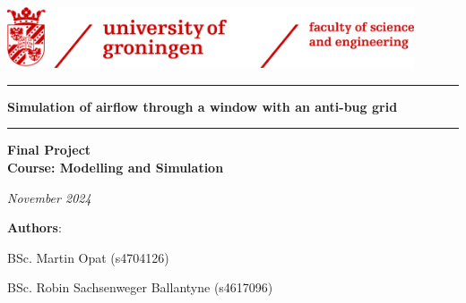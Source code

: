 \documentclass[a4paper, 12pt]{article}
\begin{document}
\begin{titlepage}
    \centering
    \includegraphics[width=0.9\textwidth]{figures/fse.png}\par\vspace{1cm}
    \vspace*{4cm} %
    \hrule height 2pt
    \vspace{0.4cm}
    {\huge\bfseries Simulation of airflow through a window with an anti-bug grid \par}
    \vspace{0.4cm}
    \hrule height 2pt
    \vspace{2cm} %
    {\Large\bfseries Final Project \\ Course: Modelling and Simulation \par}
    \vspace{4cm}

    \begin{flushleft} %
        {\large \textit{November 2024}\par}
        \vspace{2cm}
        {\large \textbf{Authors}: \par}
        {\large BSc. Martin Opat (s4704126) \par}
        \vspace{0.5cm}
        {\large BSc. Robin Sachsenweger Ballantyne (s4617096) \par}
    \end{flushleft}
    \vfill
\end{titlepage}

% 

% 

\textbf{\tableofcontents}
\newpage

\newpage

\end{document}

